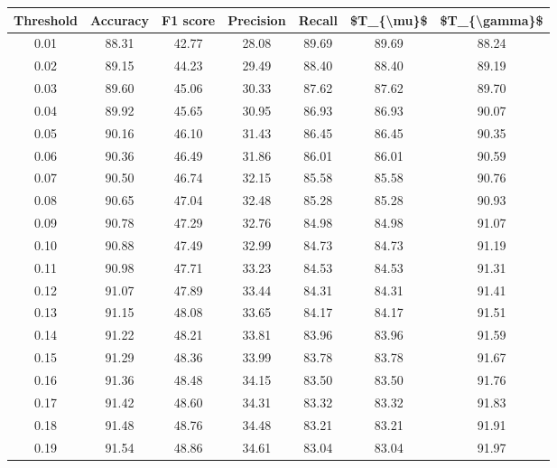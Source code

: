 \begin{tabular}{|c|c|c|c|c|c|c|}
\hline
 Threshold &  Accuracy &  F1 score &  Precision &  Recall &  \$T\_\{\textbackslash mu\}\$ &  \$T\_\{\textbackslash gamma\}\$ \\
\hline
      0.01 &     88.31 &     42.77 &      28.08 &   89.69 &      89.69 &         88.24 \\
      0.02 &     89.15 &     44.23 &      29.49 &   88.40 &      88.40 &         89.19 \\
      0.03 &     89.60 &     45.06 &      30.33 &   87.62 &      87.62 &         89.70 \\
      0.04 &     89.92 &     45.65 &      30.95 &   86.93 &      86.93 &         90.07 \\
      0.05 &     90.16 &     46.10 &      31.43 &   86.45 &      86.45 &         90.35 \\
      0.06 &     90.36 &     46.49 &      31.86 &   86.01 &      86.01 &         90.59 \\
      0.07 &     90.50 &     46.74 &      32.15 &   85.58 &      85.58 &         90.76 \\
      0.08 &     90.65 &     47.04 &      32.48 &   85.28 &      85.28 &         90.93 \\
      0.09 &     90.78 &     47.29 &      32.76 &   84.98 &      84.98 &         91.07 \\
      0.10 &     90.88 &     47.49 &      32.99 &   84.73 &      84.73 &         91.19 \\
      0.11 &     90.98 &     47.71 &      33.23 &   84.53 &      84.53 &         91.31 \\
      0.12 &     91.07 &     47.89 &      33.44 &   84.31 &      84.31 &         91.41 \\
      0.13 &     91.15 &     48.08 &      33.65 &   84.17 &      84.17 &         91.51 \\
      0.14 &     91.22 &     48.21 &      33.81 &   83.96 &      83.96 &         91.59 \\
      0.15 &     91.29 &     48.36 &      33.99 &   83.78 &      83.78 &         91.67 \\
      0.16 &     91.36 &     48.48 &      34.15 &   83.50 &      83.50 &         91.76 \\
      0.17 &     91.42 &     48.60 &      34.31 &   83.32 &      83.32 &         91.83 \\
      0.18 &     91.48 &     48.76 &      34.48 &   83.21 &      83.21 &         91.91 \\
      0.19 &     91.54 &     48.86 &      34.61 &   83.04 &      83.04 &         91.97 \\

\end{tabular}
